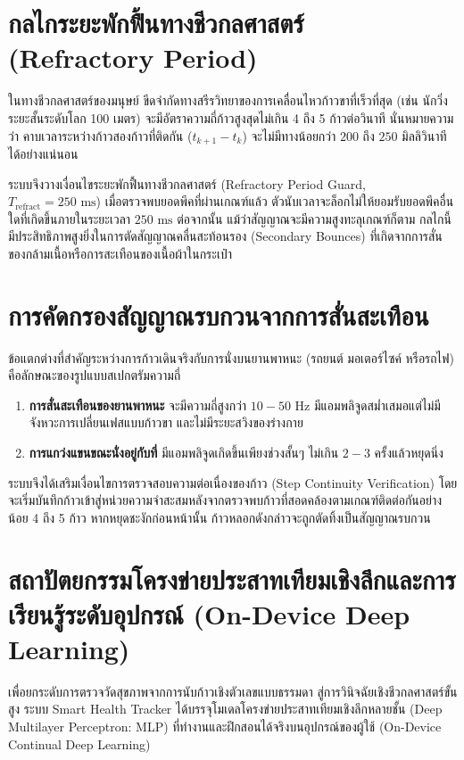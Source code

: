 \section{กลไกระยะพักฟื้นทางชีวกลศาสตร์ (Refractory Period)}
ในทางชีวกลศาสตร์ของมนุษย์ ขีดจำกัดทางสรีรวิทยาของการเคลื่อนไหวก้าวขาที่เร็วที่สุด (เช่น นักวิ่งระยะสั้นระดับโลก 100 เมตร) จะมีอัตราความถี่ก้าวสูงสุดไม่เกิน 4 ถึง 5 ก้าวต่อวินาที นั่นหมายความว่า คาบเวลาระหว่างก้าวสองก้าวที่ติดกัน ($t_{k+1} - t_k$) จะไม่มีทางน้อยกว่า $200$ ถึง $250\text{ มิลลิวินาที}$ ได้อย่างแน่นอน

ระบบจึงวางเงื่อนไขระยะพักฟื้นทางชีวกลศาสตร์ (Refractory Period Guard, $T_{\text{refract}} = 250\text{ ms}$) เมื่อตรวจพบยอดพีคที่ผ่านเกณฑ์แล้ว ตัวนับเวลาจะล็อกไม่ให้ยอมรับยอดพีคอื่นใดที่เกิดขึ้นภายในระยะเวลา $250\text{ ms}$ ต่อจากนั้น แม้ว่าสัญญาณจะมีความสูงทะลุเกณฑ์ก็ตาม กลไกนี้มีประสิทธิภาพสูงยิ่งในการตัดสัญญาณคลื่นสะท้อนรอง (Secondary Bounces) ที่เกิดจากการสั่นของกล้ามเนื้อหรือการสะเทือนของเนื้อผ้าในกระเป๋า

\section{การคัดกรองสัญญาณรบกวนจากการสั่นสะเทือน}
ข้อแตกต่างที่สำคัญระหว่างการก้าวเดินจริงกับการนั่งบนยานพาหนะ (รถยนต์ มอเตอร์ไซค์ หรือรถไฟ) คือลักษณะของรูปแบบสเปกตรัมความถี่
\begin{enumerate}
    \item \textbf{การสั่นสะเทือนของยานพาหนะ} จะมีความถี่สูงกว่า $10 - 50\text{ Hz}$ มีแอมพลิจูดสม่ำเสมอแต่ไม่มีจังหวะการเปลี่ยนเฟสแบบก้าวขา และไม่มีระยะสวิงของร่างกาย
    \item \textbf{การแกว่งแขนขณะนั่งอยู่กับที่} มีแอมพลิจูดเกิดขึ้นเพียงช่วงสั้นๆ ไม่เกิน $2 - 3$ ครั้งแล้วหยุดนิ่ง
\end{enumerate}

ระบบจึงได้เสริมเงื่อนไขการตรวจสอบความต่อเนื่องของก้าว (Step Continuity Verification) โดยจะเริ่มบันทึกก้าวเข้าสู่หน่วยความจำสะสมหลังจากตรวจพบก้าวที่สอดคล้องตามเกณฑ์ติดต่อกันอย่างน้อย 4 ถึง 5 ก้าว หากหยุดชะงักก่อนหน้านั้น ก้าวหลอกดังกล่าวจะถูกตัดทิ้งเป็นสัญญาณรบกวน

\section{สถาปัตยกรรมโครงข่ายประสาทเทียมเชิงลึกและการเรียนรู้ระดับอุปกรณ์ (On-Device Deep Learning)}
เพื่อยกระดับการตรวจวัดสุขภาพจากการนับก้าวเชิงตัวเลขแบบธรรมดา สู่การวินิจฉัยเชิงชีวกลศาสตร์ขั้นสูง ระบบ Smart Health Tracker ได้บรรจุโมเดลโครงข่ายประสาทเทียมเชิงลึกหลายชั้น (Deep Multilayer Perceptron: MLP) ที่ทำงานและฝึกสอนได้จริงบนอุปกรณ์ของผู้ใช้ (On-Device Continual Deep Learning)

